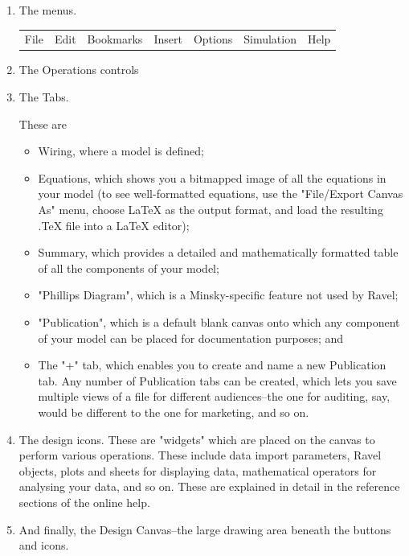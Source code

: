 \begin{enumerate}
\item  The menus.

  \begin{tabular}{lllllll}
    File & Edit & Bookmarks & Insert & Options & Simulation & Help \\
  \end{tabular}

\item  The Operations controls


\item The Tabs. 


These are 

\begin{itemize}
\item Wiring, where a model is defined;
\item Equations, which shows you a bitmapped image of all the equations in your model (to see well-formatted equations, use the "File/Export Canvas As" menu, choose LaTeX as the output format, and load the resulting .TeX file into a LaTeX editor);
\item Summary, which provides a detailed and mathematically formatted table of all the components of your model;
\item "Phillips Diagram", which is a Minsky-specific feature not used by Ravel;
\item "Publication", which is a default blank canvas onto which any component of your model can be placed for documentation purposes; and
\item The "+" tab, which enables you to create and name a new Publication tab. Any number of Publication tabs can be created, which lets you save multiple views of a file for different audiences--the one for auditing, say, would be different to the one for marketing, and so on.

\end{itemize}



\item The design icons. These are "widgets" which are placed on the canvas to perform various operations. These include data import parameters, Ravel objects, plots and sheets for displaying data, mathematical operators for analysing your data, and so on. These are explained in detail in the reference sections of the online help.


\item And finally, the Design Canvas--the large drawing area beneath the buttons and icons.

\end{enumerate}

